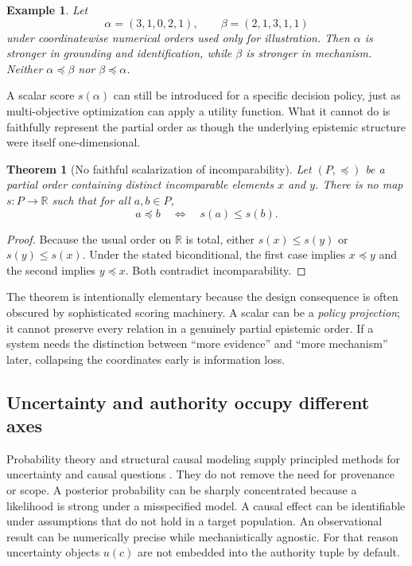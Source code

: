 \documentclass[11pt]{article}
\newtheorem{theorem}{Theorem}
\newtheorem{example}{Example}
\begin{document}
\begin{example}
Let
\[
\alpha=(3,1,0,2,1),\qquad \beta=(2,1,3,1,1)
\]
under coordinatewise numerical orders used only for illustration. Then \(\alpha\) is stronger in grounding and identification, while \(\beta\) is stronger in mechanism. Neither \(\alpha\preceq\beta\) nor \(\beta\preceq\alpha\).
\end{example}

A scalar score \(s(\alpha)\) can still be introduced for a specific decision policy, just as multi-objective optimization can apply a utility function. What it cannot do is faithfully represent the partial order as though the underlying epistemic structure were itself one-dimensional.

\begin{theorem}[No faithful scalarization of incomparability]
Let \((P,\preceq)\) be a partial order containing distinct incomparable elements \(x\) and \(y\). There is no map \(s:P\to\mathbb R\) such that for all \(a,b\in P\),
\[
a\preceq b\quad\Longleftrightarrow\quad s(a)\le s(b).
\]
\end{theorem}

\begin{proof}
Because the usual order on \(\mathbb R\) is total, either \(s(x)\le s(y)\) or \(s(y)\le s(x)\). Under the stated biconditional, the first case implies \(x\preceq y\) and the second implies \(y\preceq x\). Both contradict incomparability.
\end{proof}

The theorem is intentionally elementary because the design consequence is often obscured by sophisticated scoring machinery. A scalar can be a \emph{policy projection}; it cannot preserve every relation in a genuinely partial epistemic order. If a system needs the distinction between ``more evidence'' and ``more mechanism'' later, collapsing the coordinates early is information loss.

\subsection{Uncertainty and authority occupy different axes}

Probability theory and structural causal modeling supply principled methods for uncertainty and causal questions \cite{pearl2009,halpern2016}. They do not remove the need for provenance or scope. A posterior probability can be sharply concentrated because a likelihood is strong under a misspecified model. A causal effect can be identifiable under assumptions that do not hold in a target population. An observational result can be numerically precise while mechanistically agnostic. For that reason uncertainty objects \(u(c)\) are not embedded into the authority tuple by default.
\end{document}

